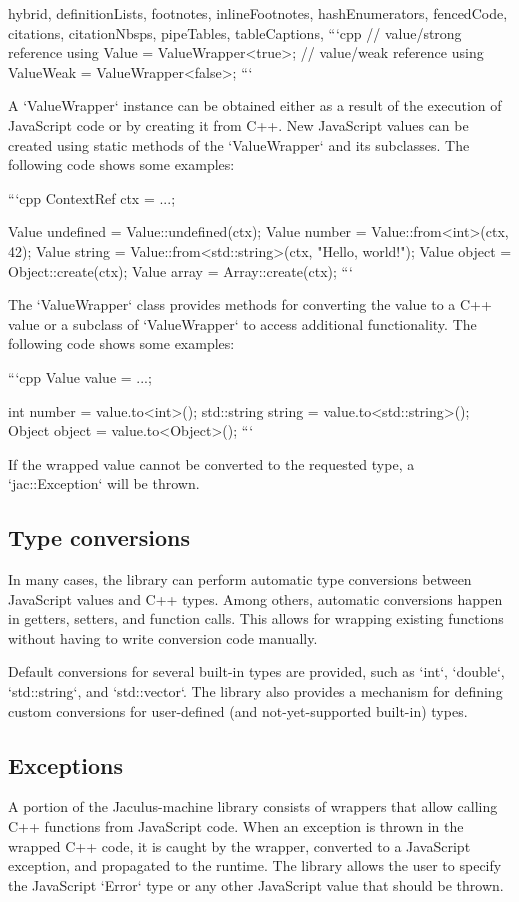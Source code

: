 \begin{markdown*}{%
  hybrid,
  definitionLists,
  footnotes,
  inlineFootnotes,
  hashEnumerators,
  fencedCode,
  citations,
  citationNbsps,
  pipeTables,
  tableCaptions,
}
```cpp
// value/strong reference
using Value = ValueWrapper<true>;
// value/weak reference
using ValueWeak = ValueWrapper<false>;
```

A `ValueWrapper` instance can be obtained either as a result of the execution of JavaScript code or by creating it from C++. New JavaScript values can be created using static methods of the `ValueWrapper` and its subclasses. The following code shows some examples:

```cpp
ContextRef ctx = ...;

Value undefined = Value::undefined(ctx);
Value number = Value::from<int>(ctx, 42);
Value string = Value::from<std::string>(ctx, "Hello, world!");
Value object = Object::create(ctx);
Value array = Array::create(ctx);
```

The `ValueWrapper` class provides methods for converting the value to a C++ value or a subclass of `ValueWrapper` to access additional functionality. The following code shows some examples:

```cpp
Value value = ...;

int number = value.to<int>();
std::string string = value.to<std::string>();
Object object = value.to<Object>();
```

If the wrapped value cannot be converted to the requested type, a `jac::Exception` will be thrown.

\subsection{Type conversions}

In many cases, the library can perform automatic type conversions between JavaScript values and C++ types. Among others, automatic conversions happen in getters, setters, and function calls. This allows for wrapping existing functions without having to write conversion code manually.

Default conversions for several built-in types are provided, such as `int`, `double`, `std::string`, and `std::vector`. The library also provides a mechanism for defining custom conversions for user-defined (and not-yet-supported built-in) types.

\subsection{Exceptions}

A portion of the Jaculus-machine library consists of wrappers that allow calling C++ functions from JavaScript code. When an exception is thrown in the wrapped C++ code, it is caught by the wrapper, converted to a JavaScript exception, and propagated to the runtime. The library allows the user to specify the JavaScript `Error` type or any other JavaScript value that should be thrown.


\end{markdown*}
